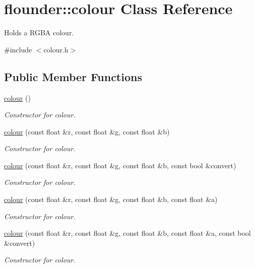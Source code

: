 \hypertarget{classflounder_1_1colour}{}\section{flounder\+:\+:colour Class Reference}
\label{classflounder_1_1colour}


Holds a R\+G\+BA colour.  




{\ttfamily \#include $<$colour.\+h$>$}

\subsection*{Public Member Functions}
\begin{DoxyCompactItemize}
\item 
\hyperlink{classflounder_1_1colour_a63a24979006e1472ae81c1be0d62f2cc}{colour} ()
\begin{DoxyCompactList}\small\item\em Constructor for colour. \end{DoxyCompactList}\item 
\hyperlink{classflounder_1_1colour_a398f40f90e10ec7d9ee9e6ce71147eca}{colour} (const float \&r, const float \&g, const float \&b)
\begin{DoxyCompactList}\small\item\em Constructor for colour. \end{DoxyCompactList}\item 
\hyperlink{classflounder_1_1colour_a0c27be9e6510b2449f38d7b4e839ca84}{colour} (const float \&r, const float \&g, const float \&b, const bool \&convert)
\begin{DoxyCompactList}\small\item\em Constructor for colour. \end{DoxyCompactList}\item 
\hyperlink{classflounder_1_1colour_a6c90f6f71418a734bfc3cd09eaf7f9f4}{colour} (const float \&r, const float \&g, const float \&b, const float \&a)
\begin{DoxyCompactList}\small\item\em Constructor for colour. \end{DoxyCompactList}\item 
\hyperlink{classflounder_1_1colour_a7c72f8a01847dd1221acfad5f2f83173}{colour} (const float \&r, const float \&g, const float \&b, const float \&a, const bool \&convert)
\begin{DoxyCompactList}\small\item\em Constructor for colour. \end{DoxyCompactList}\item 

\end{DoxyCompactItemize}
